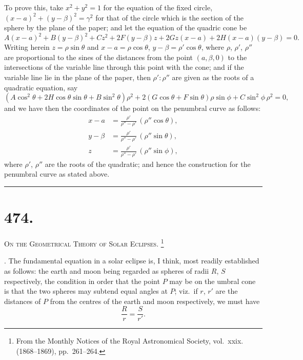 \documentclass[11pt,a4paper]{article}
\theoremstyle{definition}
\begin{document}
\newpage
\noindent
To prove this, take $x^2+y^2=1$ for the equation of the fixed circle, $(x-a)^2+(y-\beta)^2=\gamma^2$
for that of the circle which is the section of the sphere by the plane of the paper; and
let the equation of the quadric cone be
\[
A(x-a)^2 + B(y-\beta)^2 + Cz^2 + 2F(y-\beta)z + 2Gz(x-a) + 2H(x-a)(y-\beta) = 0.
\]
Writing herein $z=\rho\sin\theta$ and $x-a=\rho\cos\theta$, $y-\beta=\rho'\cos\theta$, where $\rho$, $\rho'$, $\rho''$ are
proportional to the sines of the distances from the point $(a,\beta,0)$ to the intersections of
the variable line through this point with the cone; and if the variable line lie in the
plane of the paper, then $\rho':\rho''$ are given as the roots of a quadratic equation, say
\[
(A\cos^2\theta + 2H\cos\theta\sin\theta + B\sin^2\theta)\rho^2
+ 2(G\cos\theta + F\sin\theta)\rho\sin\phi + C\sin^2\phi\,\rho^2 = 0,
\]
and we have then the coordinates of the point on the penumbral curve as follows:
\begin{align*}
x - a &= \frac{\rho'}{\rho''-\rho'}\,(\rho''\cos\theta), \\
y - \beta &= \frac{\rho'}{\rho''-\rho'}\,(\rho''\sin\theta), \\
z &= \frac{\rho'}{\rho''-\rho'}\,(\rho''\sin\phi),
\end{align*}
where $\rho'$, $\rho''$ are the roots of the quadratic; and hence the construction for the penumbral
curve as stated above.

\hfill\rule{1.5cm}{0.4pt}

\newpage

\section*{474.}
\markboth{ON THE GEOMETRICAL THEORY OF SOLAR ECLIPSES.}{474]}

\noindent\textsc{On the Geometrical Theory of Solar Eclipses.}%
\footnote{From the Monthly Notices of the Royal Astronomical Society, vol.~xxix. (1868--1869), pp.~261--264.}

\smallskip

. The fundamental equation in a solar eclipse is, I think, most readily established as
follows: the earth and moon being regarded as spheres of radii $R$, $S$ respectively, the
condition in order that the point $P$ may be on the umbral cone is that the two spheres
may subtend equal angles at $P$; viz.~if $r$, $r'$ are the distances of $P$ from the centres of the
earth and moon respectively, we must have
\[
\frac{R}{r} = \frac{S}{r'}.
\]
\end{document}

